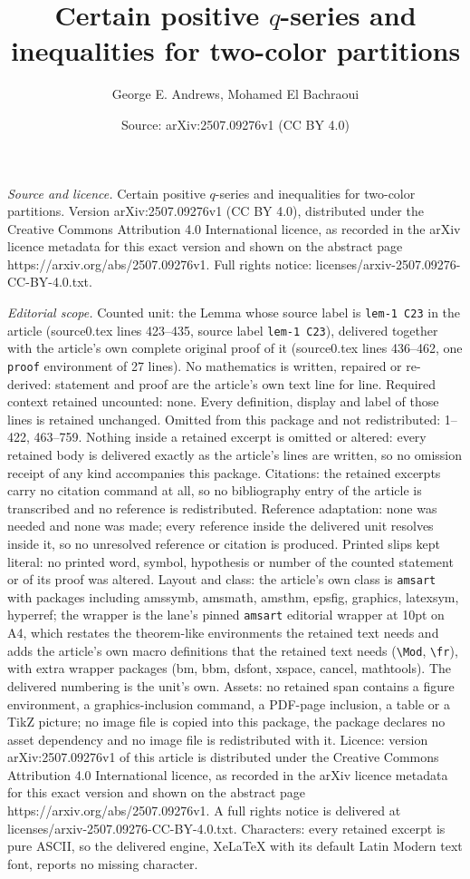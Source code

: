 \documentclass[10pt,a4paper]{amsart}
\title[Certain positive $q$-series and inequalities for two-color p]{Certain positive $q$-series and inequalities for two-color partitions}
\author{George E. Andrews, Mohamed El Bachraoui}
\date{Source: arXiv:2507.09276v1 (CC BY 4.0)}
\begin{document}
\maketitle

\noindent\emph{Source and licence.} Certain positive $q$-series and inequalities for two-color partitions. Version arXiv:2507.09276v1 (CC BY 4.0), distributed under the Creative Commons Attribution 4.0 International licence, as recorded in the arXiv licence metadata for this exact version and shown on the abstract page https://arxiv.org/abs/2507.09276v1. Full rights notice: licenses/arxiv-2507.09276-CC-BY-4.0.txt.\par\smallskip

\noindent\textit{Editorial scope.} Counted unit: the Lemma whose source label is \texttt{lem-1 C23} in the article (source0.tex lines 423--435, source label \texttt{lem-1 C23}), delivered together with the article's own complete original proof of it (source0.tex lines 436--462, one \texttt{proof} environment of 27 lines). No mathematics is written, repaired or re-derived: statement and proof are the article's own text line for line. Required context retained uncounted: none. Every definition, display and label of those lines is retained unchanged. Omitted from this package and not redistributed: 1--422, 463--759. Nothing inside a retained excerpt is omitted or altered: every retained body is delivered exactly as the article's lines are written, so no omission receipt of any kind accompanies this package. Citations: the retained excerpts carry no citation command at all, so no bibliography entry of the article is transcribed and no reference is redistributed. Reference adaptation: none was needed and none was made; every reference inside the delivered unit resolves inside it, so no unresolved reference or citation is produced. Printed slips kept literal: no printed word, symbol, hypothesis or number of the counted statement or of its proof was altered. Layout and class: the article's own class is \texttt{amsart} with packages including amssymb, amsmath, amsthm, epsfig, graphics, latexsym, hyperref; the wrapper is the lane's pinned \texttt{amsart} editorial wrapper at 10pt on A4, which restates the theorem-like environments the retained text needs and adds the article's own macro definitions that the retained text needs (\texttt{\textbackslash Mod}, \texttt{\textbackslash fr}), with extra wrapper packages (bm, bbm, dsfont, xspace, cancel, mathtools). The delivered numbering is the unit's own. Assets: no retained span contains a figure environment, a graphics-inclusion command, a PDF-page inclusion, a table or a TikZ picture; no image file is copied into this package, the package declares no asset dependency and no image file is redistributed with it. Licence: version arXiv:2507.09276v1 of this article is distributed under the Creative Commons Attribution 4.0 International licence, as recorded in the arXiv licence metadata for this exact version and shown on the abstract page https://arxiv.org/abs/2507.09276v1. A full rights notice is delivered at licenses/arxiv-2507.09276-CC-BY-4.0.txt. Characters: every retained excerpt is pure ASCII, so the delivered engine, XeLaTeX with its default Latin Modern text font, reports no missing character.
\end{document}

